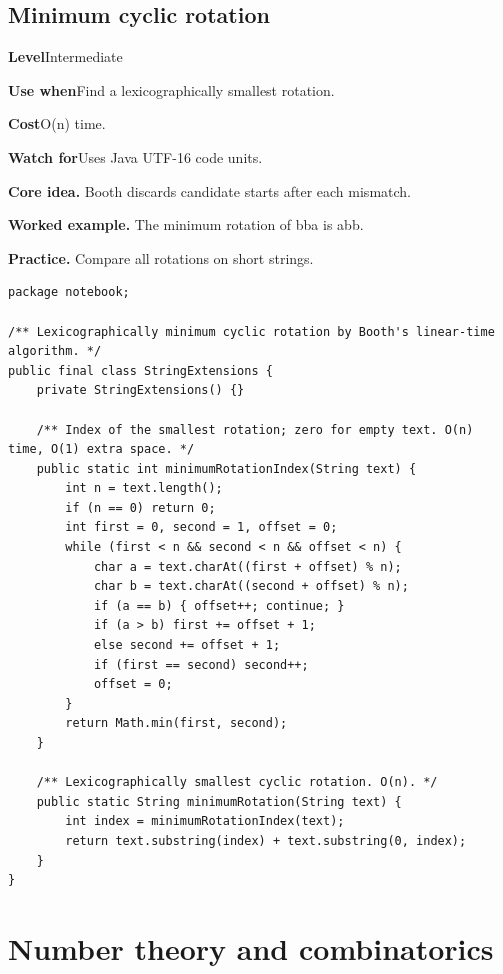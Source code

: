 \documentclass[10pt,letterpaper]{article}
\newcommand{\entrylabel}[1]{\textcolor{accent}{\bfseries #1}}
\begin{document}
\subsection{Minimum cyclic rotation}
\begin{guidebox}\small
\entrylabel{Level}\quad Intermediate\par
\entrylabel{Use when}\quad Find a lexicographically smallest rotation.\par
\entrylabel{Cost}\quad O(n) time.\par
\entrylabel{Watch for}\quad Uses Java UTF-16 code units.\par
\end{guidebox}
\noindent\textbf{Core idea.} Booth discards candidate starts after each mismatch.\par
\noindent\textbf{Worked example.} The minimum rotation of bba is abb.\par
\noindent\textbf{Practice.} Compare all rotations on short strings.\par
\begin{lstlisting}
package notebook;

/** Lexicographically minimum cyclic rotation by Booth's linear-time algorithm. */
public final class StringExtensions {
    private StringExtensions() {}

    /** Index of the smallest rotation; zero for empty text. O(n) time, O(1) extra space. */
    public static int minimumRotationIndex(String text) {
        int n = text.length();
        if (n == 0) return 0;
        int first = 0, second = 1, offset = 0;
        while (first < n && second < n && offset < n) {
            char a = text.charAt((first + offset) % n);
            char b = text.charAt((second + offset) % n);
            if (a == b) { offset++; continue; }
            if (a > b) first += offset + 1;
            else second += offset + 1;
            if (first == second) second++;
            offset = 0;
        }
        return Math.min(first, second);
    }

    /** Lexicographically smallest cyclic rotation. O(n). */
    public static String minimumRotation(String text) {
        int index = minimumRotationIndex(text);
        return text.substring(index) + text.substring(0, index);
    }
}
\end{lstlisting}
\section{Number theory and combinatorics}
\end{document}
